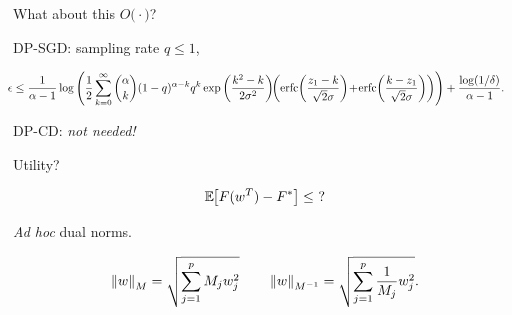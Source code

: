\documentclass{beamer}
\begin{document}
\begin{frame}
  \vspace{1em}

  \begin{center}
    \Huge What about this $O\Big( \cdot \Big)$?
  \end{center}

  \vspace{1em}

  DP-SGD: sampling rate $q \le 1$,

  {\tiny
    \begin{align*}
      \!\!\!\epsilon & \le \frac{1}{\alpha - 1} \log\left(
                       \frac{1}{2}\sum_{k=0}^\infty \binom{\alpha}{k} (1-q)^{\alpha-k}q^k \exp\left(\frac{k^2-k}{2\sigma^2} \right) \!\!\left( \erfc\!\left(\frac{z_1-k}{\sqrt{2}\sigma}\right) \!+\! \erfc\!\left(\frac{k-z_1}{\sqrt{2}\sigma} \right) \right)
                       \right)
                       + \frac{\log(1/\delta)}{\alpha - 1}.
    \end{align*}
  }
  \pause

  DP-CD: \emph{not needed!}

  \vspace{-1.5em}

\end{frame}

\begin{frame}
  \vspace{1em}

  \begin{center}
    \Huge Utility?
  \end{center}

  \begin{align*}
    \mathbb E_{} \hspace{-0.29em} \left[ F(w^T)-F^* \right] \le ~?
  \end{align*}
\end{frame}

\begin{frame}
  \begin{center}
    \Huge \textit{Ad hoc} dual norms.
  \end{center}

  \Large
  \begin{align*}
    \left \lVert w \right \rVert_{M} = \sqrt{ \sum_{j=1}^p M_j w_j^2 }
    \qquad
    \left \lVert w \right \rVert_{M^{-1}} = \sqrt{ \sum_{j=1}^p \frac{1}{M_j} w_j^2 }.
  \end{align*}
\end{frame}
\end{document}
